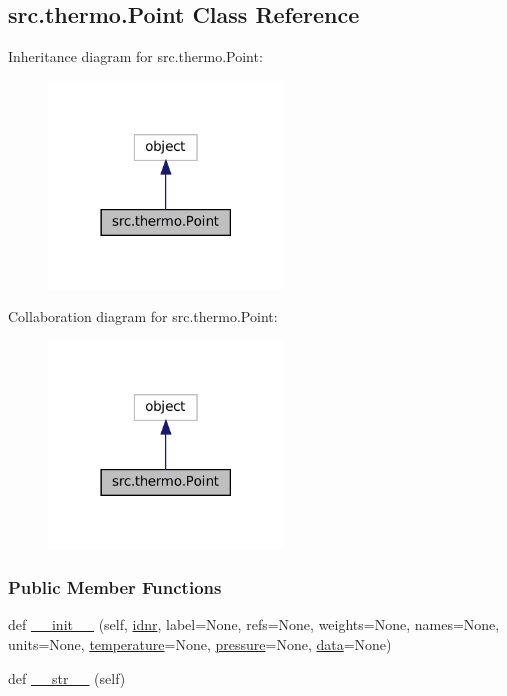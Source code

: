 \hypertarget{classsrc_1_1thermo_1_1Point}{}\subsection{src.\+thermo.\+Point Class Reference}
\label{classsrc_1_1thermo_1_1Point}


Inheritance diagram for src.\+thermo.\+Point\+:
\nopagebreak
\begin{figure}[H]
\begin{center}
\leavevmode
\includegraphics[width=177pt]{classsrc_1_1thermo_1_1Point__inherit__graph}
\end{center}
\end{figure}


Collaboration diagram for src.\+thermo.\+Point\+:
\nopagebreak
\begin{figure}[H]
\begin{center}
\leavevmode
\includegraphics[width=177pt]{classsrc_1_1thermo_1_1Point__coll__graph}
\end{center}
\end{figure}
\subsubsection*{Public Member Functions}
\begin{DoxyCompactItemize}
\item 
def \hyperlink{classsrc_1_1thermo_1_1Point_ad5886f8b7ed716eeeb8c263674aff5df}{\+\_\+\+\_\+init\+\_\+\+\_\+} (self, \hyperlink{classsrc_1_1thermo_1_1Point_ac4fff75295ef24bb94e46b4650ed0705}{idnr}, label=None, refs=None, weights=None, names=None, units=None, \hyperlink{classsrc_1_1thermo_1_1Point_a8f760387fad2b278aa16425b73763df3}{temperature}=None, \hyperlink{classsrc_1_1thermo_1_1Point_a0c1946b31c49f730423633f2ebb187a5}{pressure}=None, \hyperlink{classsrc_1_1thermo_1_1Point_a26e3c069e4a02a1698c2eb8fd129f14b}{data}=None)
\item 
def \hyperlink{classsrc_1_1thermo_1_1Point_a4909f4ebc0b6cd519ec7f579d41ca926}{\+\_\+\+\_\+str\+\_\+\+\_\+} (self)
\end{DoxyCompactItemize}
